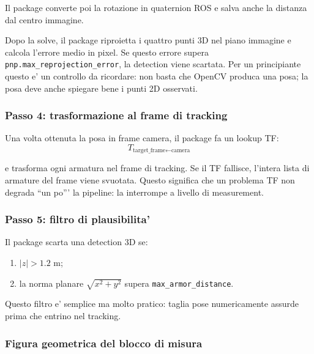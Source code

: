 \documentclass[11pt,a4paper]{article}
\newcommand{\code}[1]{\texttt{#1}}
\begin{document}
Il package converte poi la rotazione in quaternion ROS e salva anche la distanza dal centro immagine.

Dopo la solve, il package riproietta i quattro punti 3D nel piano immagine e calcola l'errore medio in pixel. Se questo errore supera \code{pnp.max\_reprojection\_error}, la detection viene scartata. Per un principiante questo e' un controllo da ricordare: non basta che OpenCV produca una posa; la posa deve anche spiegare bene i punti 2D osservati.

\subsubsection{Passo 4: trasformazione al frame di tracking}

Una volta ottenuta la posa in frame camera, il package fa un lookup TF:
\begin{equation}
  T_{\text{target\_frame} \leftarrow \text{camera}}
\end{equation}

e trasforma ogni armatura nel frame di tracking. Se il TF fallisce, l'intera lista di armature del frame viene svuotata. Questo significa che un problema TF non degrada ``un po''' la pipeline: la interrompe a livello di measurement.

\subsubsection{Passo 5: filtro di plausibilita'}

Il package scarta una detection 3D se:
\begin{enumerate}[leftmargin=1.4em]
  \item \(|z| > 1.2\) m;
  \item la norma planare \(\sqrt{x^2 + y^2}\) supera \code{max\_armor\_distance}.
\end{enumerate}

Questo filtro e' semplice ma molto pratico: taglia pose numericamente assurde prima che entrino nel tracking.

\subsubsection{Figura geometrica del blocco di misura}
\end{document}
